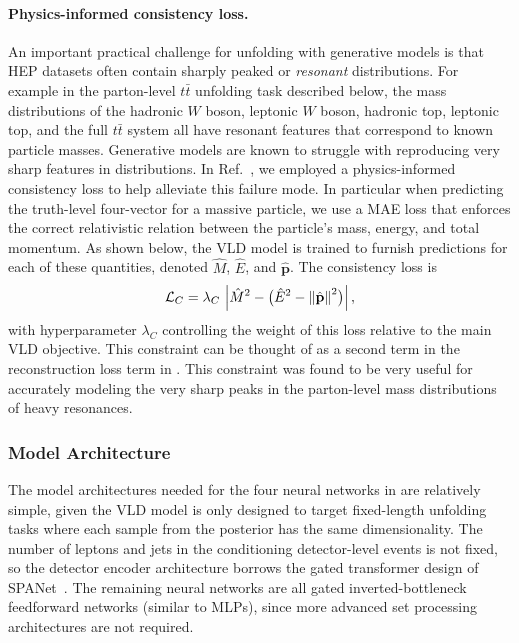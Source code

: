\paragraph{Physics-informed consistency loss.}
An important practical challenge for unfolding with generative models is that HEP datasets often contain sharply peaked or \textit{resonant} distributions.
For example in the parton-level $t\bar{t}$ unfolding task described below, the mass distributions of the hadronic $W$ boson, leptonic $W$ boson, hadronic top, leptonic top, and the full $t\bar{t}$ system all have resonant features that correspond to known particle masses.
Generative models are known to struggle with reproducing very sharp features in distributions.
In Ref.~\cite{Shmakov:2023kjj}, we employed a physics-informed consistency loss to help alleviate this failure mode.
In particular when predicting the truth-level four-vector for a massive particle, we use a MAE loss that enforces the correct relativistic relation between the particle's mass, energy, and total momentum. 
As shown below, the VLD model is trained to furnish predictions for each of these quantities, denoted $\hat{M}$, $\hat{E}$, and $\hat{\mathbf{p}}$.
The consistency loss is
\begin{equation}
    \mathcal{L}_C = \lambda_C\,\left|\hat{M}^2 - \bigl(\hat{E}^2 - \left\|\hat{\mathbf{p}}\right\|^2\bigr)\right|,
    \label{eq:vld-consistency}
\end{equation}
with hyperparameter $\lambda_C$ controlling the weight of this loss relative to the main VLD objective.
This constraint can be thought of as a second term in the reconstruction loss term in .
This constraint was found to be very useful for accurately modeling the very sharp peaks in the parton-level mass distributions of heavy resonances.

\subsubsection{Model Architecture}

The model architectures needed for the four neural networks in  are relatively simple, given the VLD model is only designed to target fixed-length unfolding tasks where each sample from the posterior has the same dimensionality.
The number of leptons and jets in the conditioning detector-level events is not fixed, so the detector encoder architecture borrows the gated transformer design of SPANet~\cite{Shmakov:2021qdz}.
The remaining neural networks are all gated inverted-bottleneck feedforward networks (similar to MLPs), since more advanced set processing architectures are not required.

